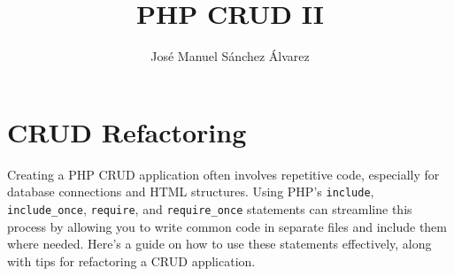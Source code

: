 \documentclass[11pt]{article}
\author{José Manuel Sánchez Álvarez}
\date{}
\title{PHP CRUD II}
\begin{document}
\maketitle
\setcounter{tocdepth}{3}
\tableofcontents

\setlength\parindent{10pt}

\section{CRUD Refactoring}
\label{sec:orga782a31}
Creating a PHP CRUD application often involves repetitive code,
especially for database connections and HTML structures. Using PHP's
\texttt{include}, \texttt{include\_once}, \texttt{require}, and \texttt{require\_once} statements can
streamline this process by allowing you to write common code in separate
files and include them where needed. Here's a guide on how to use these
statements effectively, along with tips for refactoring a CRUD
application.
\end{document}
